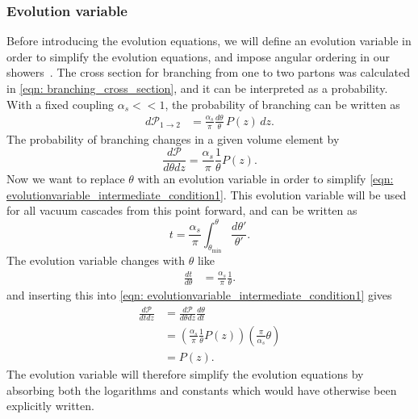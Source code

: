 \documentclass[main.tex]{subfiles}
\begin{document}
\subsubsection*{Evolution variable}
Before introducing the evolution equations, we will define an evolution variable in order to simplify the evolution equations, and impose angular ordering in our showers~\cite{Dasgupta_2015}. The cross section for branching from one to two partons was calculated in \autoref{eqn: branching_cross_section}, and it can be interpreted as a probability. With a fixed coupling \(\alpha_s << 1\), the probability of branching can be written as
\begin{align}
    d\mathcal{P}_{1\rightarrow 2} &= \frac{\alpha_s}{\pi} \frac{d\theta}{\theta} \, P(z)\, dz.
\end{align}
The probability of branching changes in a given volume element by
\begin{equation}\label{eqn: evolutionvariable_intermediate_condition1}
    \frac{d\mathcal{P}}{d\theta dz} = \frac{\alpha_s}{\pi} \frac{1}{\theta} P(z).
\end{equation}
Now we want to replace \(\theta\) with an evolution variable in order to simplify \autoref{eqn: evolutionvariable_intermediate_condition1}. This evolution variable will be used for all vacuum cascades from this point forward, and can be written as
\begin{equation}\label{eqn: evolution_variable_vacuum}
    t = \frac{\alpha_s}{\pi} \int_{\theta_{\text{min}}}^{\theta} \frac{d\theta'}{\theta'}.
\end{equation}
The evolution variable changes with \(\theta\) like
\begin{align} 
    \frac{dt}{d\theta} &= \frac{\alpha_s}{\pi} \frac{1}{\theta}.
\end{align}
and inserting this into \autoref{eqn: evolutionvariable_intermediate_condition1} gives
\begin{align}
     \frac{d\mathcal{P}}{dt dz} &= \frac{d\mathcal{P}}{d\theta dz} \frac{d\theta}{dt} \nonumber\\
    &= \left( \frac{\alpha_s}{\pi} \frac{1}{\theta} P(z) \right) \left( \frac{\pi}{\alpha_s} \theta \right) \nonumber \\
    &= P(z).
\end{align}
The evolution variable will therefore simplify the evolution equations by absorbing both the logarithms and constants which would have otherwise been explicitly written. 
\end{document}
